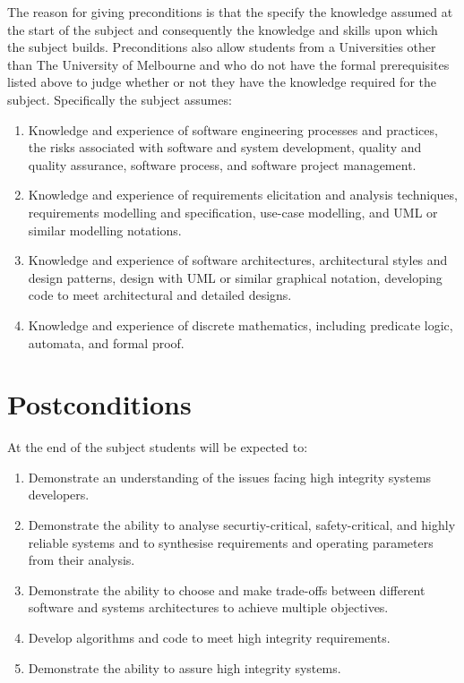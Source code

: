 \documentclass{article}
\begin{document}
The reason for giving preconditions is that the specify the knowledge assumed at the start of the subject and consequently the knowledge and skills upon which the subject builds. Preconditions also allow students from a Universities other than The University of Melbourne and who do not have the formal prerequisites listed above to judge whether or not they have the knowledge required for the subject. 
Specifically the subject assumes:

\begin{enumerate}

 \item Knowledge and experience of software engineering processes and    practices, the risks associated with software and system    development, quality and quality assurance, software process, and    software project management.

  \item Knowledge and experience of requirements elicitation and     analysis techniques, requirements modelling and specification,     use-case modelling, and UML or similar modelling notations.

  \item Knowledge and experience of software architectures,     architectural styles and design patterns, design with UML or     similar graphical notation, developing code to meet architectural     and detailed designs.

  \item Knowledge and experience of discrete mathematics, including     predicate logic, automata, and formal proof.

\end{enumerate}


\section*{Postconditions}

At the end of the subject students will be expected to:

\begin{enumerate}

 \item Demonstrate an understanding of the issues facing high    integrity systems developers.

 \item Demonstrate the ability to analyse securtiy-critical, safety-critical, and highly reliable systems and to synthesise    requirements and operating parameters from their analysis.

 \item Demonstrate the ability to choose and make trade-offs between    different software and systems architectures to achieve multiple    objectives.

 \item Develop algorithms and code to meet high integrity    requirements.

  \item Demonstrate the ability to assure high integrity systems.

\end{enumerate}
\end{document}
